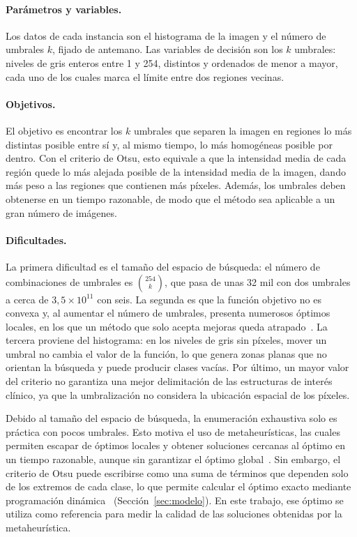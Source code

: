 \documentclass[letter, 10pt]{article}
\begin{document}
\paragraph{Parámetros y variables.} Los datos de cada instancia son el histograma de la imagen y el número de umbrales $k$, fijado de antemano. Las variables de decisión son los $k$ umbrales: niveles de gris enteros entre 1 y 254, distintos y ordenados de menor a mayor, cada uno de los cuales marca el límite entre dos regiones vecinas.

\paragraph{Objetivos.} El objetivo es encontrar los $k$ umbrales que separen la imagen en regiones lo más distintas posible entre sí y, al mismo tiempo, lo más homogéneas posible por dentro. Con el criterio de Otsu, esto equivale a que la intensidad media de cada región quede lo más alejada posible de la intensidad media de la imagen, dando más peso a las regiones que contienen más píxeles. Además, los umbrales deben obtenerse en un tiempo razonable, de modo que el método sea aplicable a un gran número de imágenes.

\paragraph{Dificultades.} La primera dificultad es el tamaño del espacio de búsqueda: el número de combinaciones de umbrales es $\binom{254}{k}$, que pasa de unas 32 mil con dos umbrales a cerca de $3{,}5 \times 10^{11}$ con seis. La segunda es que la función objetivo no es convexa y, al aumentar el número de umbrales, presenta numerosos óptimos locales, en los que un método que solo acepta mejoras queda atrapado~\cite{Hammouche2010Comparative}. La tercera proviene del histograma: en los niveles de gris sin píxeles, mover un umbral no cambia el valor de la función, lo que genera zonas planas que no orientan la búsqueda y puede producir clases vacías. Por último, un mayor valor del criterio no garantiza una mejor delimitación de las estructuras de interés clínico, ya que la umbralización no considera la ubicación espacial de los píxeles.

Debido al tamaño del espacio de búsqueda, la enumeración exhaustiva solo es práctica con pocos umbrales. Esto motiva el uso de metaheur\'isticas, las cuales permiten escapar de \'optimos locales y obtener soluciones cercanas al \'optimo en un tiempo razonable, aunque sin garantizar el \'optimo global~\cite{Hammouche2010Comparative, Lameesa2024Role}. Sin embargo, el criterio de Otsu puede escribirse como una suma de términos que dependen solo de los extremos de cada clase, lo que permite calcular el óptimo exacto mediante programación dinámica~\cite{Fisher1958Grouping, Luessi2009Framework} (Sección~\ref{sec:modelo}). En este trabajo, ese óptimo se utiliza como referencia para medir la calidad de las soluciones obtenidas por la metaheurística.
\end{document}
